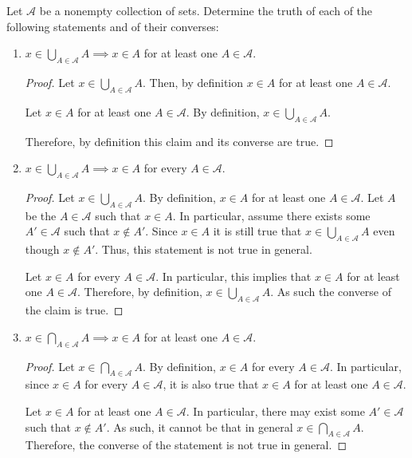 \documentclass[12pt]{article}
\begin{document}
\pagebreak
{} Let $\mathcal{A}$ be a nonempty collection of sets. Determine the truth
of each of the following statements and of their converses:
\begin{enumerate}[label=(\alph*)]
	\item $x \in \bigcup_{A \in \mathcal{A}} A \implies x \in A$ for at least one 
	$A \in \mathcal{A}$.
	
	\begin{proof}
		Let $x \in \bigcup_{A \in \mathcal{A}} A$. Then, by definition 
		$x \in A$ for at least one $A \in \mathcal{A}$. 
		
		Let $x \in A$ for at least one $A \in \mathcal{A}$. By definition, $x \in 
		\bigcup_{A \in \mathcal{A}} A$. 
		
		Therefore, by definition this claim and its converse are true.
	\end{proof}
	
	\item $x \in \bigcup_{A \in \mathcal{A}} A \implies x \in A$ for every $A \in \mathcal{A}$.
	
	\begin{proof}
		Let $x \in \bigcup_{A \in \mathcal{A}} A$. By definition, $x \in A$ for at least
		one $A \in \mathcal{A}$. Let $A$ be the $A \in \mathcal{A}$ such that 
		$x \in A$. In particular, assume there exists some $A' \in \mathcal{A}$
		such that $x \notin A'$. Since $x \in A$ it is still true that 
		$x \in \bigcup_{A \in \mathcal{A}} A$ even though $x \notin A'$. Thus,
		this statement is not true in general.
		
		Let $x \in A$ for every $A \in \mathcal{A}$. In particular, this implies that
		$x \in A$ for at least one $A \in \mathcal{A}$. Therefore, by definition,
		$x \in \bigcup_{A \in \mathcal{A}}A$. As such the converse of the claim is true.
	\end{proof}
	
	\item $x \in \bigcap_{A \in \mathcal{A}} A \implies x \in A$ for at least one 
	$A \in \mathcal{A}$.
	
	\begin{proof}
		Let $x \in \bigcap_{A \in \mathcal{A}} A$. By definition, $x \in A$ for every
		$A \in \mathcal{A}$. In particular, since $x \in A$ for every $A \in \mathcal{A}$,
		it is also true that $x \in A$ for at least one $A \in \mathcal{A}$.
		
		Let $x \in A$ for at least one $A \in \mathcal{A}$. In particular, there may
		exist some $A' \in \mathcal{A}$ such that $x \notin A'$. As such,
		it cannot be that in general $x \in \bigcap_{A \in \mathcal{A}} A$.
		Therefore, the converse of the statement is not true in general.
	\end{proof}
	

\end{enumerate}
\end{document}
